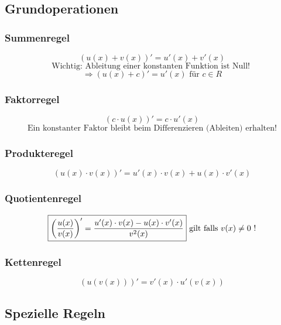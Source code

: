 \subsection{Grundoperationen}

\subsubsection{Summenregel}
\[ \boxed{ (u(x) + v(x))' = u'(x) + v'(x) } \]
\[ \text{Wichtig: Ableitung einer konstanten Funktion ist Null! } \]
\[ \Rightarrow (u(x) + c)' = u'(x) \text{ für } c \in R \]

\subsubsection{Faktorregel}
\[ \boxed{ (c \cdot u(x))' = c \cdot u'(x) } \]
\[ \text{Ein konstanter Faktor bleibt beim Differenzieren (Ableiten) erhalten!} \]

\subsubsection{Produkteregel}
\[ \boxed{ (u(x) \cdot v(x))' = u'(x) \cdot v(x) + u(x) \cdot v'(x) } \]

\subsubsection{Quotientenregel}
\[ \boxed{ \left( \frac{u(x)}{v(x)} \right)' = \frac{ u'(x) \cdot v(x) - u(x) \cdot v'(x) }{ v^2(x) } } \\ \text{ gilt falls }v(x) \neq 0 \text{ !} \]

\subsubsection{Kettenregel}
\[ \boxed{ (u(v(x)))' = v'(x) \cdot u'(v(x)) } \]

\newpage

\subsection{Spezielle Regeln}

